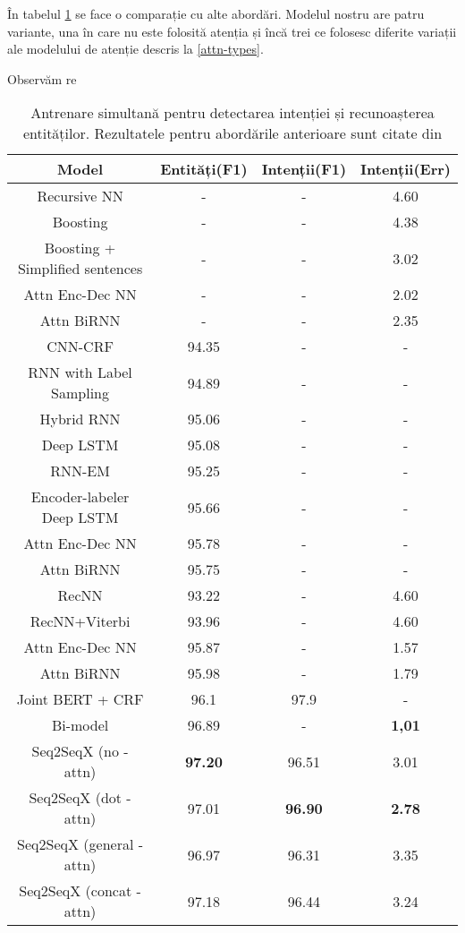 În tabelul \ref{rezultate-comp} se face o comparație cu alte abordări. Modelul nostru are patru variante, una în care nu este folosită atenția și încă trei ce folosesc diferite variații ale modelului de atenție descris la \ref{attn-types}.

Observăm re

\begin{table}[htp]
	\small
	\centering
	\begin{tabular}{ c c c c} 
		\hline
		\textbf{Model} 		 & \textbf{Entități(F1)} & \textbf{Intenții(F1)} & \textbf{Intenții(Err)} \\
		\hline
		\hline
		Recursive NN \cite{recursive-nn-intent} & - & - & 4.60 \\
		Boosting \cite{boosting-intent} & - & - & 4.38 \\
		Boosting + Simplified sentences \cite{boostingplus-intent} & - & - & 3.02 \\
		Attn Enc-Dec NN \cite{att_joint_bing} & - & - & 2.02 \\
		Attn BiRNN \cite{att_joint_bing} & - & - & 2.35 \\
		\hline
		\hline
		CNN-CRF \cite{sarika-cnn-crf} & 94.35 & - & - \\
		RNN with Label Sampling \cite{rnn-label-samp} & 94.89 & - & - \\
		Hybrid RNN \cite{mesnil-rnn-crf} & 95.06 & - & - \\
		Deep LSTM \cite{deep-lstm} & 95.08 & - & - \\
		RNN-EM \cite{rnn-em} & 95.25 & - & - \\
		Encoder-labeler Deep LSTM \cite{ecn-deep-lstm} & 95.66 & - & - \\
		Attn Enc-Dec NN \cite{att_joint_bing} & 95.78 & - & - \\
		Attn BiRNN \cite{att_joint_bing} & 95.75 & - & - \\
		\hline
		\hline
		RecNN \cite{recursive-nn-intent} & 93.22 & - & 4.60 \\
		RecNN+Viterbi \cite{recursive-nn-intent} & 93.96 & - & 4.60 \\
		Attn Enc-Dec NN \cite{att_joint_bing} & 95.87 & - & 1.57 \\
		Attn BiRNN \cite{att_joint_bing} & 95.98 & - & 1.79 \\
		Joint BERT + CRF \cite{joint-bert} & 96.1 & 97.9 & - \\
		Bi-model \cite{bi-model} & 96.89 & - & \textbf{1,01} \\
		\hline
		Seq2SeqX (no - attn) & \textbf{97.20} & 96.51 & 3.01 \\ %
		Seq2SeqX (dot - attn) & 97.01 & \textbf{96.90} & \textbf{2.78} \\ %
		Seq2SeqX (general - attn) & 96.97 & 96.31 & 3.35 \\ %
		Seq2SeqX (concat - attn) & 97.18 & 96.44 & 3.24 \\ %
		\hline
	\end{tabular}
	\caption{Antrenare simultană pentru detectarea intenției și recunoașterea entităților. Rezultatele pentru abordările anterioare sunt citate din \cite{att_joint_bing}}
	\label{rezultate-comp}
\end{table}

